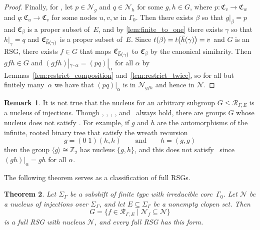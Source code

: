 \documentclass[11pt,letterpaper]{amsart}
\newtheorem{theorem}{Theorem}[section]
\theoremstyle{definition}
\newtheorem{remark}[theorem]{Remark}
\newcommand{\Z}{\mathbb{Z}}
\newcommand{\R}{\mathcal{R}}
\newcommand{\Nuc}{\mathcal{N}}
\newcommand{\C}{\mathfrak{C}}
\newcommand{\oh}{\mkern 2mu\overline{\mkern-2mu h\mkern-0.25mu}\mkern 0.25mu}
\begin{document}
\begin{proof}
Finally, for \ProdNuc, let $p\in \Nuc_g$ and $q\in \Nuc_h$ for some $g,h\in G$, where $p\colon \C_v\to \C_w$ and $q\colon \C_u\to \C_v$ for some nodes $u,v,w$ in $\Gamma_0$. 
Then there exists $\beta$ so that $g|_\beta=p$ and $\C_{\beta}$ is a proper subset of~$E$, and by \cref{lem:finite_to_one} there exists $\gamma$ so that $h|_\gamma=q$ and $\C_{\oh(\gamma)}$ is a proper subset of~$E$. Since $t(\beta)=t\bigl(\oh(\gamma)\bigr)=v$ and $G$ is an RSG, there exists $f\in G$ that maps $\C_{\oh(\gamma)}$ to $\C_\beta$ by the canonical similarity. Then $gfh\in G$ and $(gfh)|_{\gamma\cdot\alpha}=(pq)|_\alpha$ for all $\alpha$ by Lemmas~\ref{lem:restrict_composition} and~\ref{lem:restrict_twice}, so for all but finitely many~$\alpha$ we have that $(pq)|_\alpha$ is in $\Nuc_{gfh}$ and hence in $\Nuc$.
\end{proof}

\begin{remark}
It is not true that the nucleus for an arbitrary subgroup $G\leq \R_{\Gamma,E}$ is a nucleus of injections.  Though \MapNuc, \IdNuc, \LocNuc, \RecurNuc, and \InvNuc\ always hold, there are groups $G$ whose nucleus does not satisfy \ProdNuc.  For example, if $g$ and $h$ are the automorphisms of the infinite, rooted binary tree that satisfy the wreath recursion
\[
g = (0\;1)(h,h)\qquad\text{and}\qquad h=(g,g)
\]
then the group $\langle g\rangle\cong \Z_2$ has nucleus $\{g,h\}$, and this does not satisfy \ProdNuc\ since $(gh)|_\alpha=gh$ for all $\alpha$. 
\end{remark}

The following theorem serves as a classification of full RSGs.

\begin{theorem}\label{thrm:RSGCharacterization}
Let $\Sigma_\Gamma$ be a subshift of finite type with irreducible core~$\Gamma_0$. Let $\Nuc$ be a nucleus of injections over $\Sigma_\Gamma$, and let $E\subseteq \Sigma_\Gamma$ be a nonempty clopen set. Then
\[
G = \{f\in \R_{\Gamma,E} \mid \Nuc_f\subseteq \Nuc\}
\]
is a full RSG with nucleus $\Nuc$, and every full RSG has this form.
\end{theorem}
\end{document}
